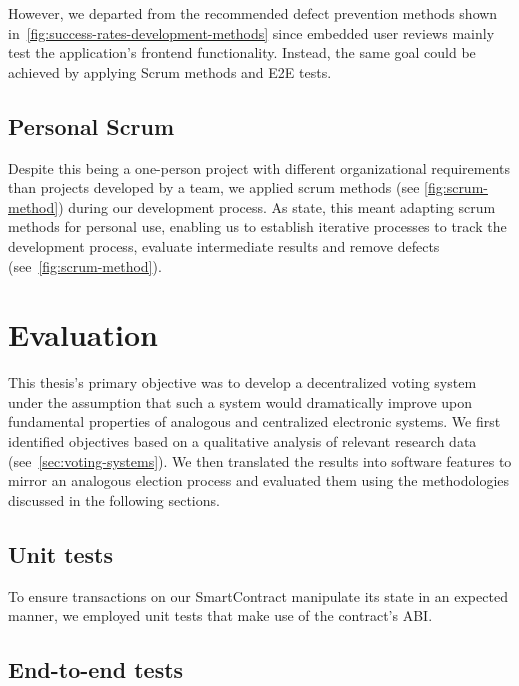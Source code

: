 However, we departed from the recommended defect prevention methods shown in~\cref{fig:success-rates-development-methods} since embedded user reviews mainly test the application’s frontend functionality.
Instead, the same goal could be achieved by applying Scrum methods and \gls{E2E} tests.

\subsection{Personal Scrum}\label{subsec:personal-scrum}

Despite this being a one-person project with different organizational requirements than projects developed by a team, we applied scrum methods (see \cref{fig:scrum-method}) during our development process.
As \textcites{andrews_scrum_2017}{pahuja_scrum_2015} state, this meant adapting scrum methods for personal use, enabling us to establish iterative processes to track the development process, evaluate intermediate results and remove defects (see~\cref{fig:scrum-method}).


\section{Evaluation}\label{sec:evaluation}

This thesis's primary objective was to develop a decentralized voting system under the assumption that such a system would dramatically improve upon fundamental properties of analogous and centralized electronic systems.
We first identified objectives based on a qualitative analysis of relevant research data (see~\cref{sec:voting-systems}).
We then translated the results into software features to mirror an analogous election process and evaluated them using the methodologies discussed in the following sections.

\subsection{Unit tests}\label{subsec:unit-tests}

To ensure transactions on our \gls{SmartContract} manipulate its state in an expected manner, we employed unit tests that make use of the contract's \gls{ABI}.

\subsection{End-to-end tests}\label{subsec:end-to-end-tests}

